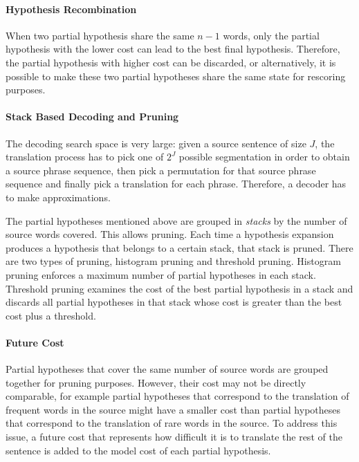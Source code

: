 \paragraph{Hypothesis Recombination}

When two partial hypothesis share the same $n - 1$
words, only the partial hypothesis with the lower
cost can lead to the best final hypothesis. Therefore,
the partial hypothesis with higher cost can be discarded, or
alternatively, it is possible to make these two partial
hypotheses share the same state for rescoring purposes.

\paragraph{Stack Based Decoding and Pruning}

The decoding search space is very large: given a source sentence of size
$J$, the translation process has to pick one of $2^J$ possible segmentation
in order to obtain a source phrase sequence, then pick a permutation
for that source phrase sequence and finally pick a translation for each
phrase. Therefore, a decoder has to make approximations.

The partial hypotheses mentioned above are grouped in \emph{stacks}
by the number of source words covered.
This allows pruning. Each time a hypothesis expansion produces a hypothesis that
belongs to a certain stack, that stack is pruned.
There are two types of pruning, histogram pruning and threshold
pruning. Histogram pruning enforces a maximum number
of partial hypotheses in each stack. Threshold pruning
examines the cost of the best partial hypothesis in a stack
and discards all partial hypotheses in that stack whose cost
is greater than the best cost plus a threshold.

\paragraph{Future Cost}

Partial hypotheses that cover the same number of source
words are grouped together for pruning purposes. However,
their cost may not be directly comparable, for example
partial hypotheses that correspond to the translation of frequent
words in the source might have a smaller cost than partial hypotheses
that correspond to the translation of rare words in the source.
To address this issue, a future cost that represents how difficult it is
to translate the rest of the sentence is added to the model cost of each
partial hypothesis.

